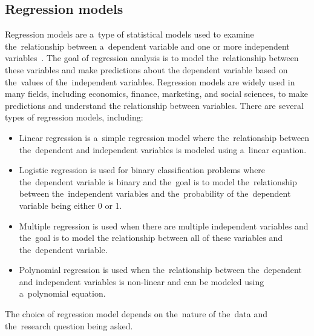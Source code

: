 \subsection{Regression models}\label{sec:regression}
Regression models are a~type of statistical models used to examine the~relationship between a~dependent variable
and one or more independent variables~\cite{Fahrmeir}.
The goal of regression analysis is to model the~relationship between these variables and make predictions about
the dependent variable based on the~values of the~independent variables. Regression models are widely used in many
fields, including economics, finance, marketing, and social sciences, to make predictions and understand the
relationship between variables. There are several types of regression models, including:
\begin{itemize}
    \item Linear regression is a~simple regression model where the~relationship between the~dependent and independent
    variables is modeled using a~linear equation.
    \item Logistic regression is used for binary classification problems where the~dependent variable is binary and the~goal is to model the~relationship between the~independent variables and the~probability of the~dependent
    variable being either 0 or 1.
    \item Multiple regression is used when there are multiple independent variables and the~goal is to model the
    relationship between all of these variables and the~dependent variable.
    \item Polynomial regression is used when the~relationship between the~dependent and independent variables
    is non-linear and can be modeled using a~polynomial equation.
\end{itemize}

The choice of regression model depends on the~nature of the~data and the~research question being asked.


